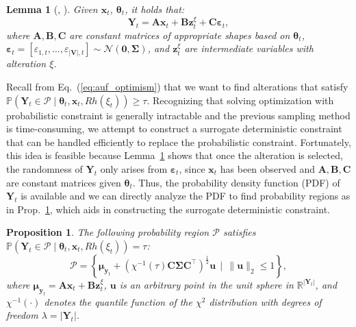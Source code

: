 \documentclass{article}
\theoremstyle{plain}
\newtheorem{proposition}[theorem]{Proposition}
\newtheorem{lemma}[theorem]{Lemma}
\theoremstyle{definition}
\theoremstyle{remark}
\def \Eq {Eq.}
\def \prop {Prop.}
\def \x {\mathbf{x}}
\def \sP {\mathcal{P}}
\def \V {\mathbf{V}}
\def \Y {\mathbf{Y}}
\def \V {\mathbf{V}}
\def \C {\mathbf{C}}
\def \y {\mathbf{y}}
\def \z {\mathbf{z}}
\def \u {\mathbf{u}}
\begin{document}
\begin{lemma}[\citeauthor{qint2023srm}, \citeyear{qint2023srm}]
  \label{lemma:identi}
  Given $\x_t$, $\bm{\theta}_t$, it holds that: 
\[
\mathbf{Y}_t = \mathbf{A}\x_t+\mathbf{B}\z_t^{\xi}+\mathbf{C}\bm{\varepsilon}_t,
\]
 where $\mathbf{A},\mathbf{B},\mathbf{C}$ are constant matrices of appropriate shapes based on $\bm{\theta}_t$, 
 $\bm{\varepsilon}_t = [\varepsilon_{1, t}, \ldots, \varepsilon_{|\V|, t}]\sim \mathcal{N}\left(\bm{0}, \bm{\Sigma}\right)$, 
 and $\z_t^\xi$ are intermediate variables with alteration $\xi$.
\end{lemma}

Recall from \Eq~(\ref{eq:auf_optimism}) that we want to find alterations that satisfy $\mathbb{P}(\Y_t \in \sP\mid \bm{\theta}_t, \x_t, Rh(\xi_t)) \geq \tau$. 
Recognizing that solving optimization with probabilistic constraint is generally intractable and the previous sampling method is time-consuming, 
we attempt to construct a surrogate deterministic constraint that can be handled efficiently to replace the probabilistic constraint.
Fortunately, this idea is feasible because Lemma~\ref{lemma:identi} shows that once the alteration is selected, 
the randomness of $\Y_t$ only arises from $\bm{\varepsilon}_t$, since $\x_t$ has been observed and $\mathbf{A},\mathbf{B},\mathbf{C}$ are constant matrices given $\bm{\theta}_t$. 
Thus, the probability density function (PDF) of $\Y_t$ is available and we can directly analyze the PDF to find probability regions as in \prop~\ref{prop:prob_region}, 
which aids in constructing the surrogate deterministic constraint.

\begin{proposition}
  \label{prop:prob_region}
  The following probability region $\sP$ satisfies $\mathbb{P}(\Y_t \in \sP\mid \bm{\theta}_t, \x_t, Rh(\xi_t)) = \tau$: 
  \[
    \sP = \left\{\bm{\mu}_{\y_t} + \left(\chi^{-1}(\tau)\C\bm{\Sigma}\C^\top\right)^\frac{1}{2}\u\ \ \big|\ \ \|\u\|_2\leq 1\right\},
  \]
  where $\bm{\mu}_{\y_t} = \mathbf{A}\x_t+\mathbf{B}\z_t^{\xi}$, 
  $\u$ is an arbitrary point in the unit sphere in $\mathbb{R}^{|\Y_t|}$, 
  and $\chi^{-1}(\cdot)$ denotes the quantile function of the $\chi^2$ distribution with degrees of freedom $\lambda = \left|\Y_t\right|$.
\end{proposition}
\end{document}
